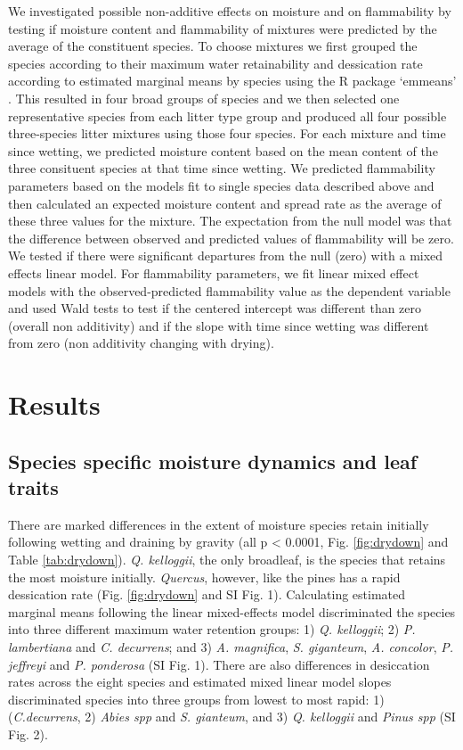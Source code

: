 \documentclass[fire,article,submit,moreauthors,pdftex]{Definitions/mdpi}
\begin{document}
We investigated possible non-additive effects on moisture and on flammability
by testing if moisture content and flammability of mixtures were predicted by
the average of the constituent species. To choose mixtures we first grouped the
species according to their maximum water retainability and dessication rate
according to estimated marginal means by species using the R package `emmeans'
\cite{Lenth-2019}. This resulted in four broad groups of species and we then
selected one representative species from each litter type group and produced
all four possible three-species litter mixtures using those four species. For
each mixture and time since wetting, we predicted moisture content based on the
mean content of the three consituent species at that time since wetting. We
predicted flammability parameters based on the models fit to single species
data described above and then calculated an expected moisture content and
spread rate as the average of these three values for the mixture. The
expectation from the null model was that the difference between observed and
predicted values of flammability will be zero. We tested if there were
significant departures from the null (zero) with a mixed effects linear model.
For flammability parameters, we fit linear mixed effect models with the
observed-predicted flammability value as the dependent variable and used Wald
tests to test if the centered intercept was different than zero (overall non
additivity) and if the slope with time since wetting was different from zero
(non additivity changing with drying).


\section{Results}

\subsection{Species specific moisture dynamics and leaf traits}

There are marked differences in the extent of moisture species retain initially
following wetting and draining by gravity (all p < 0.0001, Fig.
\ref{fig:drydown} and Table \ref{tab:drydown}). \emph{Q. kelloggii}, the only
broadleaf, is the species that retains the most moisture initially.
\emph{Quercus}, however, like the pines has a rapid dessication rate (Fig.
\ref{fig:drydown} and SI Fig. 1). Calculating estimated marginal means following the
linear mixed-effects model discriminated the species into three different
maximum water retention groups: 1) \emph{Q. kelloggii}; 2) \emph{P.
  lambertiana} and \emph{C. decurrens}; and 3) \emph{A. magnifica}, \emph{S.
  giganteum}, \emph{A. concolor}, \emph{P. jeffreyi} and \emph{P. ponderosa}
(SI Fig. 1). There are also differences in desiccation rates across the eight
species and estimated mixed linear model slopes discriminated species into
three groups from lowest to most rapid: 1) (\emph{C.decurrens}, 2) \emph{Abies
  spp} and \emph{S. gianteum}, and 3) \emph{Q. kelloggii} and \emph{Pinus spp}
(SI Fig. 2).
\end{document}
